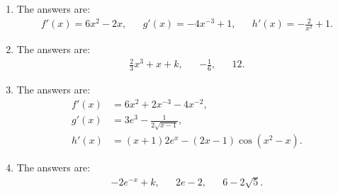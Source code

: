 \begin{enumerate}
	\item The answers are:
	\begin{align*}
	f'(x)=6x^2-2x,&& g'(x)=-4x^{-3}+1,&& h'(x)=-\frac{2}{x^{2}}+1.
	\end{align*}
	
	\item The answers are:
	\begin{align*}
	\frac{2}{3}x^3+x+k,&& -\frac{1}{6},&& 12.
	\end{align*}
	
	
	\item The answers are:
	\begin{align*}
	f'(x)&=6x^2+2x^{-3}-4x^{-2},\\ g'(x)&=3e^3-\frac{1}{2\sqrt{x-1}},\\ h'(x)&=(x+1)2e^x-(2x-1)\cos(x^2-x).
	\end{align*}
	
	\item The answers are:
	\begin{align*}
	-2e^{-x}+k,&& 2e-2, && 6-2\sqrt{5}.
	\end{align*}
\end{enumerate}
